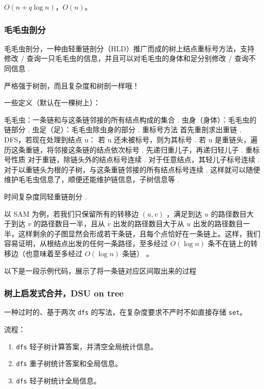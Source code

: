 \documentclass[12pt]{ctexart}
\begin{document}

$O(n+q\log n)$，$O(n)$。


\subsubsection{毛毛虫剖分}
毛毛虫剖分，一种由轻重链剖分（HLD）推广而成的树上结点重标号方法，支持修改 / 查询一只毛毛虫的信息，并且可以对毛毛虫的身体和足分别修改 / 查询不同信息 .

严格强于树剖，而且复杂度和树剖一样哦！

一些定义（默认在一棵树上）：

毛毛虫：一条链和与这条链邻接的所有结点构成的集合 .
虫身（身体）：毛毛虫的链部分 .
虫足（足）：毛毛虫除虫身的部分 .
重标号方法
首先重剖求出重链 .
DFS，若现在处理到结点 u：
若 u 还未被标号，则为其标号 .
若 u 是重链头，遍历这条重链，将邻接这条链的结点依次标号 .
先递归重儿子，再递归轻儿子 .
重标号性质
对于重链，除链头外的结点标号连续 .
对于任意结点，其轻儿子标号连续 .
对于以重链头为根的子树，与这条重链邻接的所有结点标号连续 .
这样就可以随便维护毛毛虫信息了，顺便还能维护链信息，子树信息等 .

时间复杂度同轻重链剖分 .

以 SAM 为例，若我们只保留所有的转移边 $(u,v)$ ，满足到达 $u$ 的路径数目大于到达 $v$ 的路径数目一半，且从 $v$ 出发的路径数目大于从 $u$ 出发的路径数目一半，这样剩余的子图显然会形成若干条链，且每个点恰好在一条链上。这样，我们容易证明，从根结点出发的任何一条路径，至多经过 $O(\log n)$ 条不在链上的转移边（也意味着至多经过 $O(\log n)$ 条链） 。

以下是一段示例代码，展示了将一条链对应区间取出来的过程




\subsubsection{树上启发式合并，DSU on tree}

一种过时的、基于两次 \verb|dfs| 的写法，在复杂度要求不严时不如直接存储 \verb|set|。

流程：

\begin{enumerate}
	\item \verb|dfs| 轻子树计算答案，并清空全局统计信息。
	\item \verb|dfs| 重子树统计答案和全局信息。
	\item \verb|dfs| 轻子树统计全局信息。
\end{enumerate}
\end{document}
